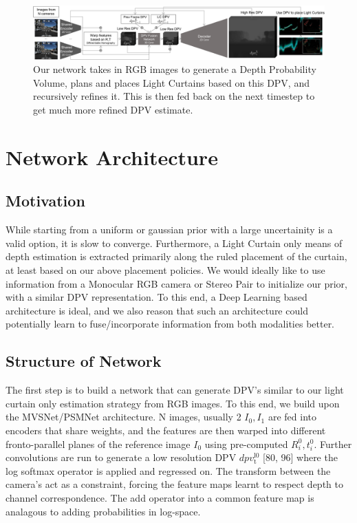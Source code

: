 \begin{figure}[t!]
    \includegraphics[width=1.0\textwidth]{figures/network.pdf}
    \caption{Our network takes in RGB images to generate a Depth Probability Volume, plans and places Light Curtains based on this DPV, and recursively refines it. This is then fed back on the next timestep to get much more refined DPV estimate. }
    \label{fig:network}
\end{figure}
    
\section{Network Architecture}

\subsection{Motivation}

While starting from a uniform or gaussian prior with a large uncertainity is a valid option, it is slow to converge. Furthermore, a Light Curtain only means of depth estimation is extracted primarily along the ruled placement of the curtain, at least based on our above placement policies. We would ideally like to use information from a Monocular RGB camera or Stereo Pair to initialize our prior, with a similar DPV representation. To this end, a Deep Learning based architecture is ideal, and we also reason that such an architecture could potentially learn to fuse/incorporate information from both modalities better.

\subsection{Structure of Network}

The first step is to build a network that can generate DPV's similar to our light curtain only estimation strategy from RGB images. To this end, we build upon the MVSNet/PSMNet architecture. N images, usually 2 $I_{0}, I_{1}$ are fed into encoders that share weights, and the features are then warped into different fronto-parallel planes of the reference image $I_{0}$ using pre-computed $R_{i}^{0}, t_{i}^{0}$. Further convolutions are run to generate a low resolution DPV $dpv_{\mathrm{t}}^{\mathrm{l0}}$ [80, 96] where the log softmax operator is applied and regressed on. The transform between the camera's act as a constraint, forcing the feature maps learnt to respect depth to channel correspondence. The add operator into a common feature map is analagous to adding probabilities in log-space. 


